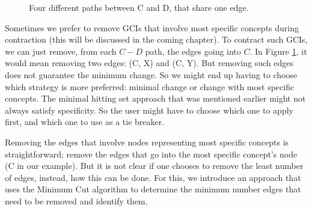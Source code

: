 \begin{figure}
\centering
{}
\caption{Four different paths between C and D, that share one edge.}
\label{ex1}
\end{figure}

Sometimes we prefer to remove GCIs that involve most specific concepts during contraction (this will be discussed in the coming chapter). To contract such GCIs, we can just remove, from each $C-D$ path, the edges going into $C$. In Figure \ref{ex1}, it would mean removing two edges: (C, X) and (C, Y). But removing such edges does not guarantee the minimum change. So we might end up having to choose which strategy is more preferred: minimal change or change with most specific concepts. The minimal hitting set approach that was mentioned earlier might not always satisfy specificity. So the user might have to choose which one to apply first, and which one to use as a tie breaker.

Removing the edges that involve nodes representing most specific concepts is straightforward; remove the edges that go into the most specific concept's node (C in our example). But it is not clear if one chooses to remove the least number of edges, instead, how this can be done. For this, we introduce an approach that uses the Minimum Cut algorithm to determine the minimum number edges that need to be removed and identify them.

